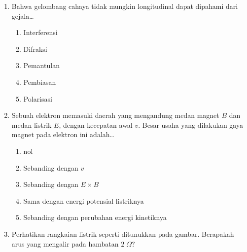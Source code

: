 \documentclass[A4,12PT, english, twocolumn]{journal}
\begin{document}
\begin{enumerate}
\item Bahwa gelombang cahaya tidak mungkin longitudinal dapat dipahami dari gejala\dots
   \begin{enumerate}
        \item Interferensi
        \item Difraksi
        \item Pemantulan
        \item Pembiasan
        \item Polarisasi
   \end{enumerate}
   
\item Sebuah elektron memasuki daerah yang mengandung medan magnet $B$ dan medan listrik $E$, dengan kecepatan awal $v$. Besar usaha yang dilakukan gaya magnet pada elektron ini adalah\dots
    \begin{enumerate}
        \item nol
        \item Sebanding dengan $v$
        \item Sebanding dengan $E \times B$
        \item Sama dengan energi potensial listriknya
        \item Sebanding dengan perubahan energi kinetiknya
    \end{enumerate}
  
\item Perhatikan rangkaian listrik seperti ditunukkan pada gambar. Berapakah arus yang mengalir pada hambatan $2 \; \Omega$?
\begin{center}
\end{center}
\end{enumerate}
\end{document}
